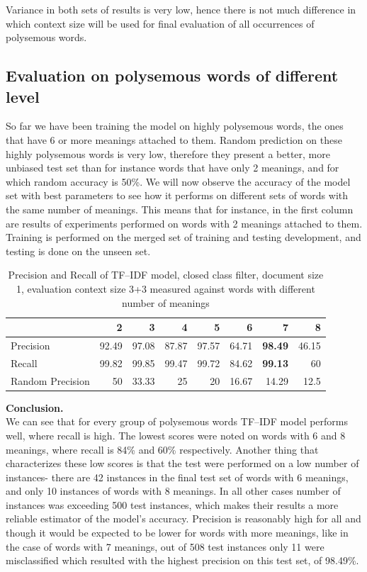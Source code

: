  Variance in both sets of results 
is very low, hence there is not much difference in which context size will be used for final evaluation
of all occurrences of polysemous words.


\subsection{ Evaluation on polysemous words of different level}
So far we have been training the model on highly polysemous words, the ones that have 6 or more 
meanings attached to them. Random prediction on these highly polysemous words is very low, therefore
they present a better, more unbiased test set than for instance words that have only 2 meanings, and 
for which random accuracy is 50\%. We will now observe the accuracy of the model set with best
parameters to see how it performs on different sets of words with the same number of meanings. This means
that for instance, in the first column are results of experiments performed on words with 2 meanings attached to them.
Training is performed on the merged set of training and testing development, and testing is done on the unseen set.

\begin{table}[h!]
\begin{tabular}{ l | r r r r r r r  }
     & 2 & 3 & 4 & 5 & 6& 7 & 8  \\
 \hline
Precision  & 92.49 & 97.08 & 87.87 & 97.57 & 64.71 & \textbf{98.49} & 46.15\\ 
Recall & 99.82 & 99.85 & 99.47 & 99.72 & 84.62 & \textbf{99.13} & 60\\ 
Random Precision & 50 & 33.33 & 25 & 20 & 16.67 & 14.29 & 12.5 \\
\end{tabular}
\caption{Precision and Recall of TF--IDF model, closed class filter, document size 1, evaluation context size 3+3 measured against words with different number of meanings}
\end{table} 

\textbf{Conclusion.}\\
We can see that for every group of polysemous words TF--IDF model performs well, where recall is high. The 
lowest scores were noted on words with 6 and 8 meanings, where recall is 84\% and 60\% respectively. Another 
thing that characterizes these low scores is that the test were performed on a low number of instances- there are 
42 instances in the final test set of words with 6 meanings, and only 10 instances of words with 8 meanings. In all other cases number of instances was exceeding 500 test instances, which makes their results a more reliable estimator of the model's accuracy. Precision is reasonably high for all and though it would be expected to be lower 
for words with more meanings, like in the case of words with 7 meanings, out of 508 test instances only 11 were misclassified which resulted with the highest precision on this test set, of  98.49\%.


